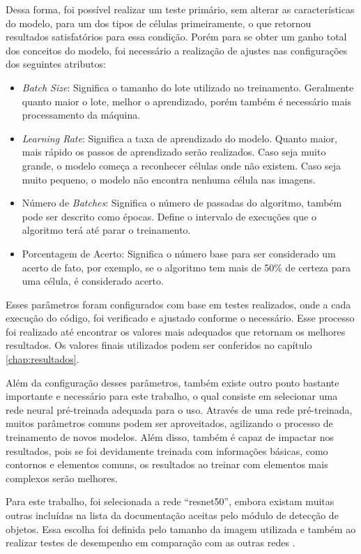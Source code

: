 Dessa forma, foi possível realizar um teste primário, sem alterar as características do modelo, para um dos tipos de células primeiramente, o que retornou resultados satisfatórios para essa condição. Porém para se obter um ganho total dos conceitos do modelo, foi necessário a realização de ajustes nas configurações dos seguintes atributos:

\begin{itemize}
    \item \emph{Batch Size}: Significa o tamanho do lote utilizado no treinamento. Geralmente quanto maior o lote, melhor o aprendizado, porém também é necessário mais processamento da máquina.
    \item \emph{Learning Rate}: Significa a taxa de aprendizado do modelo. Quanto maior, mais rápido os passos de aprendizado serão realizados. Caso seja muito grande, o modelo começa a reconhecer células onde não existem. Caso seja muito pequeno, o modelo não encontra nenhuma célula nas imagens.
    \item Número de \emph{Batches}: Significa o número de passadas do algoritmo, também pode ser descrito como épocas. Define o intervalo de execuções que o algoritmo terá até parar o treinamento.
    \item Porcentagem de Acerto: Significa o número base para ser considerado um acerto de fato, por exemplo, se o algoritmo tem mais de 50\% de certeza para uma célula, é considerado acerto.
\end{itemize}

Esses parâmetros foram configurados com base em testes realizados, onde a cada execução do código, foi verificado e ajustado conforme o necessário. Esse processo foi realizado até encontrar os valores mais adequados que retornam os melhores resultados. Os valores finais utilizados podem ser conferidos no capítulo \ref{chap:resultados}.

Além da configuração desses parâmetros, também existe outro ponto bastante importante e necessário para este trabalho, o qual consiste em selecionar uma rede neural pré-treinada adequada para o uso. Através de uma rede pré-treinada, muitos parâmetros comuns podem ser aproveitados, agilizando o processo de treinamento de novos modelos. Além disso, também é capaz de impactar nos resultados, pois se foi devidamente treinada com informações básicas, como contornos e elementos comuns, os resultados ao treinar com elementos mais complexos serão melhores.

Para este trabalho, foi selecionada a rede ``resnet50'', embora existam muitas outras incluídas na lista da documentação aceitas pelo módulo de detecção de objetos. Essa escolha foi definida pelo tamanho da imagem utilizada e também ao realizar testes de desempenho em comparação com as outras redes \cite{websiteObjectDetection}.

